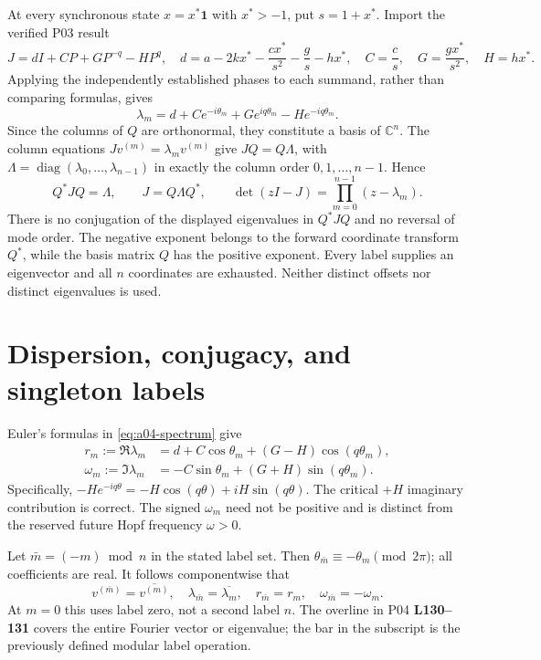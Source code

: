 \documentclass[11pt]{article}
\newcommand{\CC}{\mathbb C}
\newcommand{\one}{\mathbf 1}
\newcommand{\diag}{\operatorname{diag}}
\newcommand{\lin}[1]{\textbf{L#1}}
\begin{document}
At every synchronous state $x=x^*\one$ with $x^*>-1$, put $s=1+x^*$.
Import the verified P03 result
\[
 J=dI+CP+GP^{-q}-HP^q,\quad
 d=a-2kx^*-\frac{cx^*}{s^2}-\frac{g}{s}-hx^*,\quad
 C=\frac c s,\quad G=\frac{gx^*}{s^2},\quad H=hx^*.
\]
Applying the independently established phases to each summand, rather than
comparing formulas, gives
\begin{equation}\label{eq:a04-spectrum}
 \lambda_m=d+Ce^{-i\theta_m}+Ge^{iq\theta_m}-He^{-iq\theta_m}.
\end{equation}
Since the columns of $Q$ are orthonormal, they constitute a basis of $\CC^n$.
The column equations $Jv^{(m)}=\lambda_mv^{(m)}$ give $JQ=Q\Lambda$, with
$\Lambda=\diag(\lambda_0,\ldots,\lambda_{n-1})$ in exactly the column order
$0,1,\ldots,n-1$. Hence
\[
 Q^*JQ=\Lambda,\qquad J=Q\Lambda Q^*,\qquad
 \det(zI-J)=\prod_{m=0}^{n-1}(z-\lambda_m).
\]
There is no conjugation of the displayed eigenvalues in $Q^*JQ$ and no
reversal of mode order. The negative exponent belongs to the forward
coordinate transform $Q^*$, while the basis matrix $Q$ has the positive
exponent. Every label supplies an eigenvector and all $n$ coordinates are
exhausted. Neither distinct offsets nor distinct eigenvalues is used.

\section{Dispersion, conjugacy, and singleton labels}
Euler's formulas in \eqref{eq:a04-spectrum} give
\begin{align*}
 r_m:=\Re\lambda_m&=d+C\cos\theta_m+(G-H)\cos(q\theta_m),\\
 \omega_m:=\Im\lambda_m&=-C\sin\theta_m+(G+H)\sin(q\theta_m).
\end{align*}
Specifically, $-He^{-iq\theta}=-H\cos(q\theta)+iH\sin(q\theta)$.
The critical $+H$ imaginary contribution is correct. The signed $\omega_m$
need not be positive and is distinct from the reserved future Hopf frequency
$\omega>0$.

Let $\bar m=(-m)\bmod n$ in the stated label set. Then
$\theta_{\bar m}\equiv-\theta_m\pmod{2\pi}$; all coefficients are real.
It follows componentwise that
\[
 v^{(\bar m)}=\overline{v^{(m)}},\quad
 \lambda_{\bar m}=\overline{\lambda_m},\quad
 r_{\bar m}=r_m,\quad \omega_{\bar m}=-\omega_m.
\]
At $m=0$ this uses label zero, not a second label $n$. The overline in
P04 \lin{130--131} covers the entire Fourier vector or eigenvalue; the bar
in the subscript is the previously defined modular label operation.
\end{document}
